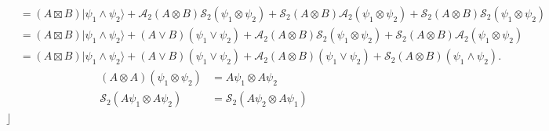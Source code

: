 \documentclass[aps, preprint]{revtex4}
\begin{document}
\begin{align*} &  =\left (A \boxtimes B\right ) \vert \psi _{1} \wedge \psi _{2} \rangle  +\mathcal{A}_{2} \left (A \otimes B\right ) \mathcal{S}_{2} \left (\psi _{1} \otimes \psi _{2}\right ) +\mathcal{S}_{2} \left (A \otimes B\right ) \mathcal{A}_{2} \left (\psi _{1} \otimes \psi _{2}\right ) +\mathcal{S}_{2} \left (A \otimes B\right ) \mathcal{S}_{2} \left (\psi _{1} \otimes \psi _{2}\right ) \\
 &  =\left (A \boxtimes B\right ) \vert \psi _{1} \wedge \psi _{2} \rangle  +\left (A \vee B\right ) \left (\psi _{1} \vee \psi _{2}\right ) +\mathcal{A}_{2} \left (A \otimes B\right ) \mathcal{S}_{2} \left (\psi _{1} \otimes \psi _{2}\right ) +\mathcal{S}_{2} \left (A \otimes B\right ) \mathcal{A}_{2} \left (\psi _{1} \otimes \psi _{2}\right ) \\
 &  =\left (A \boxtimes B\right ) \vert \psi _{1} \wedge \psi _{2} \rangle  +\left (A \vee B\right ) \left (\psi _{1} \vee \psi _{2}\right ) +\mathcal{A}_{2} \left (A \otimes B\right ) \left (\psi _{1} \vee \psi _{2}\right ) +\mathcal{S}_{2} \left (A \otimes B\right ) \left (\psi _{1} \wedge \psi _{2}\right )\text{.}\end{align*}
\begin{align}\left (A \otimes A\right ) \left (\psi _{1} \otimes \psi _{2}\right ) &  =A \psi _{1} \otimes A \psi _{2} \\
\mathcal{S}_{2} \left (A \psi _{1} \otimes A \psi _{2}\right ) &  =\mathcal{S}_{2} \left (A \psi _{2} \otimes A \psi _{1}\right )\end{align}$\rfloor $ 
\end{document}
